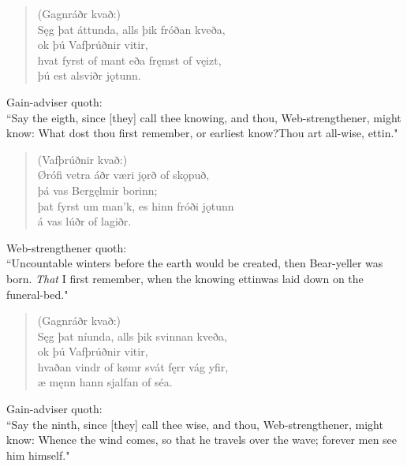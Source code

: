 \begin{verse}
(Gagnráðr kvað:) \\%
\bva Sęg þat áttunda, \hld alls þik fróðan kveða, \\%
\ind ok þú Vafþrúðnir vitir, \\%
hvat fyrst of mant \hld eða fręmst of vęizt, \\%
\ind þú est alsviðr jǫtunn.\\%
\end{verse}

\bvb Gain-adviser quoth: \\ “Say the eigth, since [they] call thee knowing, and thou, Web-strengthener, might know: What dost thou first remember, or earliest know?\footnotemark[55] Thou art all-wise, ettin." \\

\begin{verse}
(Vafþrúðnir kvað:) \\%
\bva Ørófi vetra \hld áðr væri jǫrð of skǫpuð, \\%
\ind þá vas Bergęlmir borinn; \\%
þat fyrst um man'k, \hld es hinn fróði jǫtunn \\%
\ind á vas lúðr of lagiðr.\footnotemark[30]\\%
\end{verse}

\bvb Web-strengthener quoth: \\ “Uncountable winters before the earth would be created, then Bear-yeller was born. \emph{That} I first remember, when the knowing ettin\footnotemark[60] was laid down on the funeral-bed\footnotemark[61]." \\

\begin{verse}
(Gagnráðr kvað:) \\%
\bva Sęg þat níunda, \hld alls þik svinnan kveða, \\%
\ind ok þú Vafþrúðnir vitir, \\%
hvaðan vindr of kømr \hld svát fęrr vág yfir, \\%
\ind æ męnn hann sjalfan of séa.\\%
\end{verse}

\bvb Gain-adviser quoth: \\ “Say the ninth, since [they] call thee wise, and thou, Web-strengthener, might know: Whence the wind comes, so that he travels over the wave; forever men see him himself.\footnotemark[65]" \\

